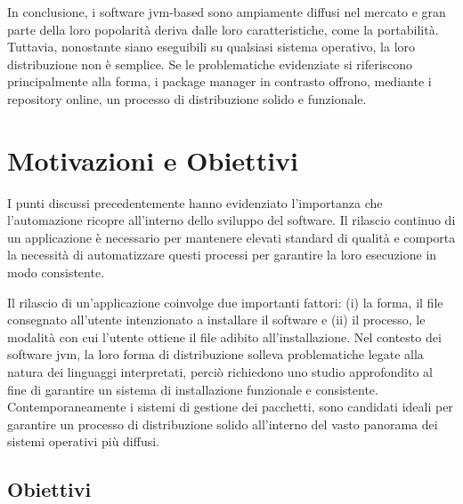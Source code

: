 In conclusione, i software \ac{jvm}-based sono ampiamente diffusi nel mercato e gran parte della loro popolarità deriva dalle loro caratteristiche, come la portabilità. Tuttavia, nonostante siano eseguibili su qualsiasi sistema operativo, la loro distribuzione non è semplice. Se le problematiche evidenziate si riferiscono principalmente alla forma, i package manager in contrasto offrono, mediante i repository online, un processo di distribuzione solido e funzionale.

\section{Motivazioni e Obiettivi}
I punti discussi precedentemente hanno evidenziato l'importanza che l'automazione ricopre all'interno dello sviluppo del software. Il rilascio continuo di un applicazione è necessario per mantenere elevati standard di qualità e comporta la necessità di automatizzare questi processi per garantire la loro esecuzione in modo consistente. 

Il rilascio di un'applicazione coinvolge due importanti fattori: (i) la forma, il file consegnato all'utente intenzionato a installare il software e (ii) il processo, le modalità con cui l'utente ottiene il file adibito all'installazione. Nel contesto dei software \ac{jvm}, la loro forma di distribuzione solleva problematiche legate alla natura dei linguaggi interpretati, perciò richiedono uno studio approfondito al fine di garantire un sistema di installazione funzionale e consistente. Contemporaneamente i sistemi di gestione dei pacchetti, sono candidati ideali per garantire un processo di distribuzione solido all'interno del vasto panorama dei sistemi operativi più diffusi.

\subsection{Obiettivi}

